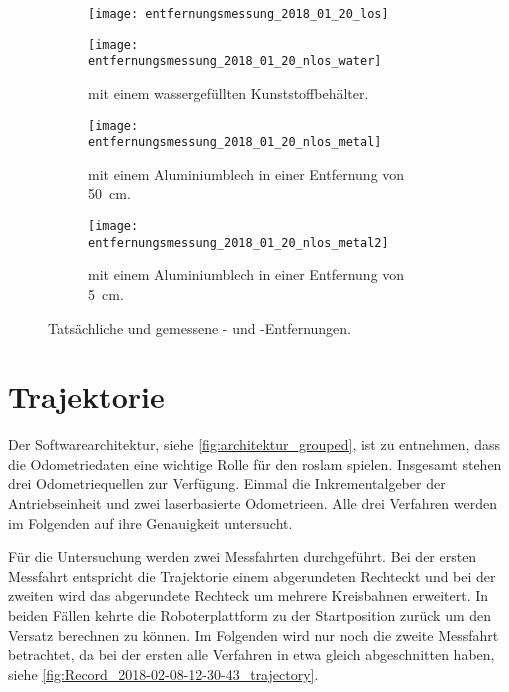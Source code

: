 \begin{figure}
	\centering
	\begin{subfigure}[t]{0.49\linewidth}
		\centering
		\texttt{[image: entfernungsmessung\_2018\_01\_20\_los]}
		\caption{}
		\label{fig:entfernungsmessung_2018_01_20_los}
	\end{subfigure}
	\hfill
	\begin{subfigure}[t]{0.49\linewidth}
		\centering
		\texttt{[image: entfernungsmessung\_2018\_01\_20\_nlos\_water]}
		\caption{ mit einem wassergefüllten Kunststoffbehälter.}
		\label{fig:entfernungsmessung_2018_01_20_nlos_water}
	\end{subfigure}
	\par
	\bigskip
	\begin{subfigure}[t]{0.49\linewidth}
		\centering
		\texttt{[image: entfernungsmessung\_2018\_01\_20\_nlos\_metal]}
		\caption{ mit einem Aluminiumblech in einer Entfernung von \SI{50}{\centi\meter}.}
		\label{fig:entfernungsmessung_2018_01_20_nlos_metal}
	\end{subfigure}
	\hfill
	\begin{subfigure}[t]{0.49\linewidth}
		\centering
		\texttt{[image: entfernungsmessung\_2018\_01\_20\_nlos\_metal2]}
		\caption{ mit einem Aluminiumblech in einer Entfernung von \SI{5}{\centi\meter}.}
		\label{fig:entfernungsmessung_2018_01_20_nlos_metal2}
	\end{subfigure}
	\caption{Tatsächliche und gemessene - und -Entfernungen.}
	\label{fig:entfernungsmessung_2018_01_20}
\end{figure}


%
%
%
\section{Trajektorie}

Der Softwarearchitektur, siehe \autoref{fig:architektur_grouped}, ist zu entnehmen, dass die Odometriedaten eine wichtige Rolle für den \gls{roslam} spielen. Insgesamt stehen drei Odometriequellen zur Verfügung. Einmal die Inkrementalgeber der Antriebseinheit und zwei laserbasierte Odometrieen. Alle drei Verfahren werden im Folgenden auf ihre Genauigkeit untersucht.

Für die Untersuchung werden zwei Messfahrten durchgeführt. Bei der ersten Messfahrt entspricht die Trajektorie einem abgerundeten Rechteckt und bei der zweiten wird das abgerundete Rechteck um mehrere Kreisbahnen erweitert. In beiden Fällen kehrte die Roboterplattform zu der Startposition zurück um den Versatz berechnen zu können. Im Folgenden wird nur noch die zweite Messfahrt betrachtet, da bei der ersten alle Verfahren in etwa gleich abgeschnitten haben, siehe \autoref{fig:Record_2018-02-08-12-30-43_trajectory}.

